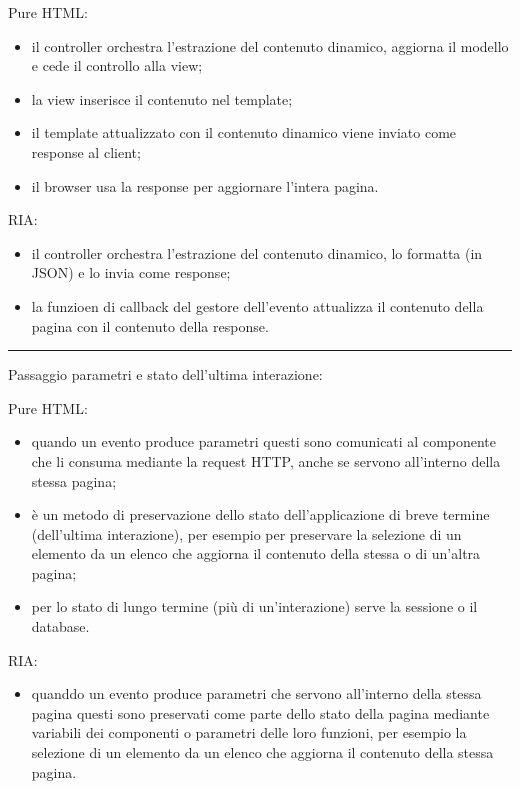 \begin{multicols}{2}
Pure HTML:
\begin{itemize}
    \item il controller orchestra l'estrazione del contenuto dinamico, aggiorna il modello e cede il controllo alla view;
    \item la view inserisce il contenuto nel template;
    \item il template attualizzato con il contenuto dinamico viene inviato come response al client;
    \item il browser usa la response per aggiornare l'intera pagina.
\end{itemize}
\vfill\null
\columnbreak
RIA:
\begin{itemize}
    \item il controller orchestra l'estrazione del contenuto dinamico, lo formatta (in JSON) e lo invia come response;
    \item la funzioen di callback del gestore dell'evento attualizza il contenuto della pagina con il contenuto della response.
\end{itemize}
\end{multicols}
\rule{\textwidth}{0,4pt}
Passaggio parametri e stato dell'ultima interazione:
\begin{multicols}{2}
Pure HTML:
\begin{itemize}
    \item quando un evento produce parametri questi sono comunicati al componente che li consuma mediante la request HTTP, anche se servono all'interno della stessa pagina;
    \item è un metodo di preservazione dello stato dell'applicazione di breve termine (dell'ultima interazione), per esempio per preservare la selezione di un elemento da un elenco che aggiorna il contenuto della stessa o di un'altra pagina;
    \item per lo stato di lungo termine (più di un'interazione) serve la sessione o il database. 
\end{itemize}
\vfill\null
\columnbreak
RIA:
\begin{itemize}
    \item quanddo un evento produce parametri che servono all'interno della stessa pagina questi sono preservati come parte dello stato della pagina mediante variabili dei componenti o parametri delle loro funzioni, per esempio la selezione di un elemento da un elenco che aggiorna il contenuto della stessa pagina.
\end{itemize}
\end{multicols}
